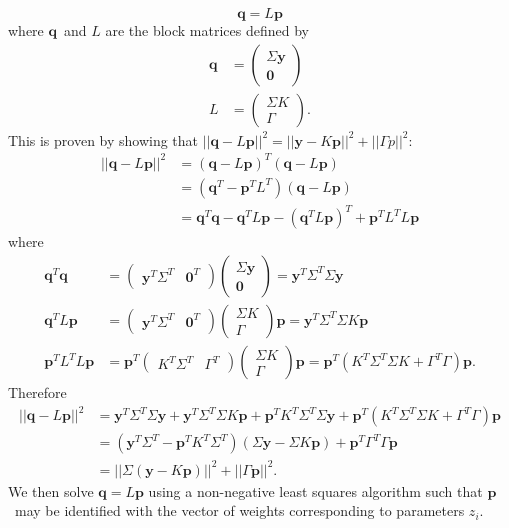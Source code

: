 \documentclass{article}
\newcommand{\y}{\ensuremath{\bm{y}}}
\newcommand{\p}{\ensuremath{\bm{p}}}
\newcommand{\q}{\ensuremath{\bm{q}}}
\begin{document}
%
\begin{equation}
\q = L\p
\end{equation}
%
where \q\ and $L$ are the block matrices defined by 
%
\begin{align}
\q &= \left(\begin{array}{c}
\Sigma\y \\ \bm{0}
\end{array}\right)\\ 
L &= 
\left(\begin{array}{c}
\Sigma K \\ \Gamma
\end{array}\right).
\end{align}
% 
This is proven by showing that $||\q-L\p||^2 = ||\y-K\p||^2+||\Gamma p||^2$: 
%
\begin{align}
||\q-L\p||^2 &= (\q-L\p)^T(\q-L\p)\\
&= (\q^T-\p^TL^T)(\q-L\p)\\
&= \q^T\q-\q^TL\p-(\q^TL\p)^T+\p^TL^TL\p
\end{align}
%
where 
%
\begin{subequations}
\begin{align}
\q^T\q &= \left(\begin{array}{cc}
\y^T\Sigma^T & \bm{0}^T
\end{array}\right)\left(\begin{array}{c}
\Sigma\y \\ \bm{0}
\end{array}\right)
= \y^T\Sigma^T\Sigma\y\\
%
\q^TL\p &= \left(\begin{array}{cc}
\y^T\Sigma^T & \bm{0}^T
\end{array}\right)\left(\begin{array}{c}
\Sigma K \\ \Gamma
\end{array}\right)\p
= \y^T\Sigma^T\Sigma K\p\\
%
\p^TL^TL\p &= \p^T\left(\begin{array}{cc}
K^T\Sigma^T & \Gamma^T
\end{array}\right)\left(\begin{array}{c}
\Sigma K \\ \Gamma
\end{array}\right)\p 
= \p^T(K^T\Sigma^T \Sigma K + \Gamma^T\Gamma)\p.
\end{align}
%
\end{subequations}
Therefore 
%
\begin{align}
||\q-L\p||^2 &= \y^T\Sigma^T\Sigma\y + \y^T\Sigma^T\Sigma K\p + \p^TK^T\Sigma^T \Sigma \y + \p^T(K^T\Sigma^T \Sigma K + \Gamma^T\Gamma)\p\\
&= (\y^T\Sigma^T -\p^TK^T\Sigma^T)(\Sigma \y -\Sigma K\p) + \p^T\Gamma^T\Gamma\p\\
&= ||\Sigma (\y - K\p)||^2 + ||\Gamma\p||^2.
\end{align}
%
We then solve $\q = L\p$ using a non-negative least squares algorithm such that \p\ may be identified with the vector of weights corresponding to parameters $z_i$.
\end{document}
